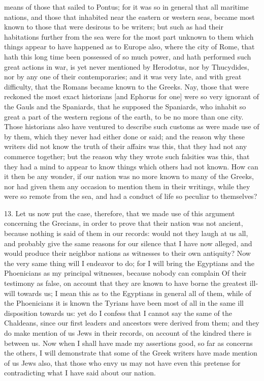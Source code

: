 means of those that sailed to Pontus; for it was so in general that all
maritime nations, and those that inhabited near the eastern or western
seas, became most known to those that were desirous to be writers; but
such as had their habitations further from the sea were for the most part
unknown to them which things appear to have happened as to Europe also,
where the city of Rome, that hath this long time been possessed of so much
power, and hath performed such great actions in war, is yet never
mentioned by Herodotus, nor by Thucydides, nor by any one of their
contemporaries; and it was very late, and with great difficulty, that the
Romans became known to the Greeks. Nay, those that were reckoned the most
exact historians [and Ephorus for one] were so very ignorant of the Gauls
and the Spaniards, that he supposed the Spaniards, who inhabit so great a
part of the western regions of the earth, to be no more than one city.
Those historians also have ventured to describe such customs as were made
use of by them, which they never had either done or said; and the reason
why these writers did not know the truth of their affairs was this, that
they had not any commerce together; but the reason why they wrote such
falsities was this, that they had a mind to appear to know things which
others had not known. How can it then be any wonder, if our nation was no
more known to many of the Greeks, nor had given them any occasion to
mention them in their writings, while they were so remote from the sea,
and had a conduct of life so peculiar to themselves?

13. Let us now put the case, therefore, that we made use of this argument
concerning the Grecians, in order to prove that their nation was not
ancient, because nothing is said of them in our records: would not they
laugh at us all, and probably give the same reasons for our silence that I
have now alleged, and would produce their neighbor nations as witnesses to
their own antiquity? Now the very same thing will I endeavor to do; for I
will bring the Egyptians and the Phoenicians as my principal witnesses,
because nobody can complain Of their testimony as false, on account that
they are known to have borne the greatest ill-will towards us; I mean this
as to the Egyptians in general all of them, while of the Phoenicians it is
known the Tyrians have been most of all in the same ill disposition
towards us: yet do I confess that I cannot say the same of the Chaldeans,
since our first leaders and ancestors were derived from them; and they do
make mention of us Jews in their records, on account of the kindred there
is between us. Now when I shall have made my assertions good, so far as
concerns the others, I will demonstrate that some of the Greek writers
have made mention of us Jews also, that those who envy us may not have
even this pretense for contradicting what I have said about our nation.

